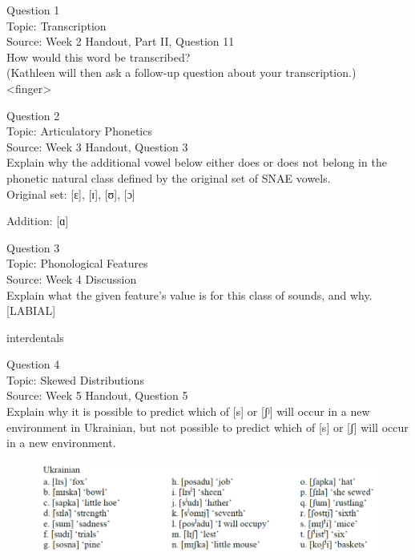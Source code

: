 \documentclass[12pt]{article}
\begin{document}
{\large Question 1}\\

Topic: Transcription\\
Source: Week 2 Handout, Part II, Question 11\\

How would this word be transcribed?\\ (Kathleen will then ask a follow-up question about your transcription.)\\

<finger>


\newpage

{\large Question 2}\\

Topic: Articulatory Phonetics\\
Source: Week 3 Handout, Question 3\\

Explain why the additional vowel below either does or does not belong in the phonetic natural class defined by the original set of SNAE vowels.\\

Original set: {[ɛ]}, {[ɪ]}, {[ʊ]}, {[ɔ]}

Addition: {[ɑ]}


\newpage

{\large Question 3}\\

Topic: Phonological Features\\
Source: Week 4 Discussion\\

Explain what the given feature’s value is for this class of sounds, and why.\\

{[LABIAL]}

interdentals


\newpage

{\large Question 4}\\

Topic: Skewed Distributions\\
Source: Week 5 Handout, Question 5\\

Explain why it is possible to predict which of [s] or [ʃʲ] will occur in a new environment in Ukrainian, but not possible to predict which of [s] or [ʃ] will occur in a new environment.\\

\begin{figure}[H]
\includegraphics{../images/ukrainian.png}
\end{figure}
\end{document}
